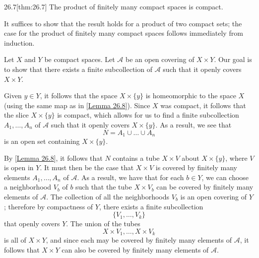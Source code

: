 \begin{thmBox}{26.7}[thm:26.7]
    The product of finitely many compact spaces is compact.

    \baseRule

    \begin{proofBox}
        It suffices to show that the result holds for a product of two compact
        sets; the case for the product of finitely many compact spaces follows
        immediately from induction.
        
        \baseSkip

        Let \( X \) and \( Y \) be compact spaces.
        Let \( \mathcal{A} \) be an open covering of \( X \times Y \).
        Our goal is to show that there exists a finite subcollection of 
        \( \mathcal{A} \) such that it openly covers \( X \times Y \).

        \baseSkip

        Given \( y \in Y \), it follows that the space \( X \times \{ y \} \)
        is homeomorphic to the space \( X \) (using the same map as in 
        [\hyperlink{lem:26.8}{Lemma 26.8}]).
        Since \( X \) was compact, it follows that the slice 
        \( X \times \{ y \} \) is compact, which allows for us 
        to find a finite subcollection \( A_{ 1 } , \ldots , A_{ n } \) of 
        \( \mathcal{A} \) such that it openly covers \( X \times \{ y \} \).
        As a result, we see that 
        \begin{equation*}
            N
            =
            A_{ 1 } \cup \ldots \cup A_{ n }
        \end{equation*}
        is an open set containing \( X \times \{ y \} \).

        \baseSkip

        By [\hyperlink{lem:26.8}{Lemma 26.8}], it follows that \( N \)
        contains a tube \( X \times V \) about \( X \times \{ y \} \),
        where \( V \) is open in \( Y \).
        It must then be the case that \( X \times V \) is covered by finitely 
        many elements \( A_{ 1 } , \ldots , A_{ n } \) of \( \mathcal{A} \).
        As a result, we have that for each \( b \in Y \), we can choose a 
        neighborhood \( V_{ b } \) of \( b \) such that the tube 
        \( X \times V_{ b } \) can be covered by finitely many elements of
        \( \mathcal{A} \).
        The collection of all the neighborhoods \( V_{ b } \) is an open
        covering of \( Y \); therefore by compactness of \( Y \), there 
        exists a finite subcollection
        \begin{equation*}
            \{ V_{ 1 } , \ldots , V_{ k } \}
        \end{equation*}
        that openly covers \( Y \).
        The union of the tubes 
        \begin{equation*}
            X \times V_{ 1 } , \ldots , X \times V_{ k }
        \end{equation*}
        is all of \( X \times Y \), and since each may be covered by finitely 
        many elements of \( \mathcal{A} \), it follows that \( X \times Y \)
        can also be covered by finitely many elements of \( \mathcal{A} \).
        

\end{proofBox}
\end{thmBox}

